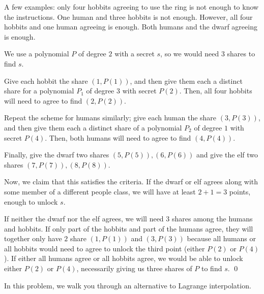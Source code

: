 \documentclass[11pt]{article}
\begin{document}
A few examples: only four hobbits agreeing to use the ring is not enough to know the instructions. One human and three hobbits is not enough. However, all four hobbits and one human agreeing is enough. Both humans and the dwarf agreeing is enough.

\begin{solution}
    We use a polynomial $P$ of degree $2$ with a secret $s$, so we would need $3$ shares to find $s$. 
    
    Give each hobbit the share $(1, P(1))$, and then give them each a distinct share for a polynomial $P_1$ of degree $3$ with secret $P(2)$. Then, all four hobbits will need to agree to find $(2, P(2))$.
    
    Repeat the scheme for humans similarly; give each human the share $(3, P(3))$, and then give them each a distinct share of a polynomial $P_2$ of degree $1$ with secret $P(4)$. Then, both humans will need to agree to find $(4, P(4))$. 
    
    Finally, give the dwarf two shares $(5, P(5)), (6, P(6))$ and give the elf two shares $(7, P(7)), (8, P(8))$.
    
    Now, we claim that this satisfies the criteria. If the dwarf or elf agrees along with some member of a different people class, we will have at least $2 + 1 = 3$ points, enough to unlock $s$. 
    
    If neither the dwarf nor the elf agrees, we will need 3 shares among the humans and hobbits. If only part of the hobbits and part of the humans agree, they will together only have $2$ share $(1, P(1))$ and $(3, P(3))$ because all humans or all hobbits would need to agree to unlock the third point (either $P(2)$ or $P(4)$). If either all humans agree or all hobbits agree, we would be able to unlock either $P(2)$ or $P(4)$, necessarily giving us three shares of $P$ to find $s$. \qed
\end{solution}

\newpage
{}  

In this problem, we walk you through an alternative to Lagrange interpolation.
\end{document}
